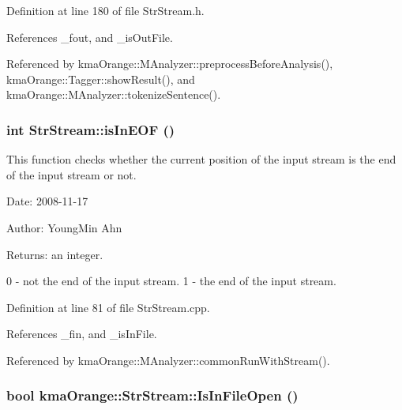 Definition at line 180 of file StrStream.h.

References \_\-fout, and \_\-isOutFile.

Referenced by kmaOrange::MAnalyzer::preprocessBeforeAnalysis(), kmaOrange::Tagger::showResult(), and kmaOrange::MAnalyzer::tokenizeSentence().\hypertarget{classkmaOrange_1_1StrStream_4a78cce030396f522ec87618e097da57}{
\subsubsection[{isInEOF}]{\setlength{\rightskip}{0pt plus 5cm}int StrStream::isInEOF ()}}
\label{classkmaOrange_1_1StrStream_4a78cce030396f522ec87618e097da57}


This function checks whether the current position of the input stream is the end of the input stream or not. 

\begin{Desc}
\item[Date:]2008-11-17 \end{Desc}
\begin{Desc}
\item[Author:]YoungMin Ahn \end{Desc}
\begin{Desc}
\item[Returns:]an integer.\par
 0 - not the end of the input stream. 1 - the end of the input stream. \end{Desc}


Definition at line 81 of file StrStream.cpp.

References \_\-fin, and \_\-isInFile.

Referenced by kmaOrange::MAnalyzer::commonRunWithStream().\hypertarget{classkmaOrange_1_1StrStream_d34724e619d312651ab85ac9a70b4e03}{
\subsubsection[{IsInFileOpen}]{\setlength{\rightskip}{0pt plus 5cm}bool kmaOrange::StrStream::IsInFileOpen ()}}
\label{classkmaOrange_1_1StrStream_d34724e619d312651ab85ac9a70b4e03}


